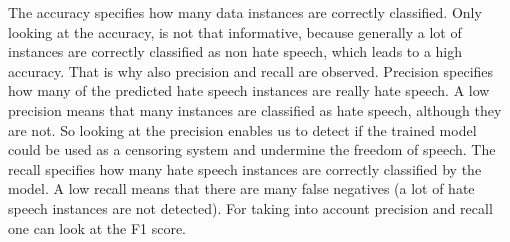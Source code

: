 The accuracy specifies how many data instances are correctly classified. Only looking at the accuracy, is not that informative, because generally a lot of instances are correctly classified as non hate speech, which leads to a high accuracy. That is why also precision and recall are observed. Precision specifies how many of the predicted hate speech instances are really hate speech. A low precision means that many instances are classified as hate speech, although they are not. So looking at the precision enables us to detect if the trained model could be used as a censoring system and undermine the freedom of speech. The recall specifies how many hate speech instances are correctly classified by the model. A low recall means that there are many false negatives (a lot of hate speech instances are not detected). For taking into account precision and recall one can look at the F1 score.

